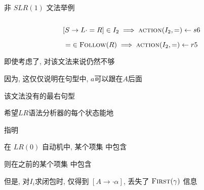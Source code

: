 \begin{frame}{}
  \begin{center}
    非 $SLR(1)$ 文法举例
  \end{center}

  \begin{columns}
  \end{columns}

  \vspace{0.30cm}
  \[
    [S \to L \cdot = R] \in I_{2} \implies \textsc{action}(I_{2}, =) \gets s6
  \]

  \[
    =\; \in \textsc{Follow}(R) \implies \textsc{action}(I_{2}, =) \gets r5
  \]
\end{frame}

\begin{frame}{}
  \begin{center}
    即使考虑了, 对该文法来说仍然不够

    \vspace{0.20cm}
    因为, 这仅仅说明在句型中, $a$可以跟在$A$后面


    该文法没有的最右句型
  \end{center}
\end{frame}

\begin{frame}{}
  \begin{center}
    希望$LR$语法分析器的每个状态能地

    \vspace{0.30cm}
    指明

    \pause
    \vspace{1.00cm}
    在 $LR(0)$ 自动机中, 某个项集  中包含 

    \vspace{0.50cm}
    则在之前的某个项集  中包含 

    \vspace{0.50cm}

    \pause
    \vspace{0.80cm}
    但是, 对$I_{i}$求闭包时, 仅得到 $[A \to \cdot \alpha]$, 丢失了 $\textsc{First}(\gamma)$ 信息
  \end{center}
\end{frame}

